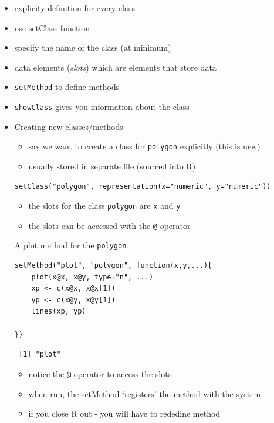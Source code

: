 \documentclass[11pt]{article}
\begin{document}
\begin{itemize}
\item explicity definition for every class
\item use setClass function
\item specify the name of the class (at minimum)
\item data elements (\emph{slots}) which are elements that store data
\item \texttt{setMethod} to define methods
\item \texttt{showClass} gives you information about the class
\end{itemize}
\begin{itemize}

\item Creating new classes/methods
\label{sec-4-3-9-1}%
\begin{itemize}
\item say we want to create a class for \texttt{polygon} explicitly (this is new)
\item usually stored in separate file (sourced into R)
\end{itemize}

\begin{verbatim}
setClass("polygon", representation(x="numeric", y="numeric"))
\end{verbatim}


\begin{itemize}
\item the slots for the class \texttt{polygon} are \texttt{x} and \texttt{y}
\item the slots can be accessed with the \texttt{@} operator
\end{itemize}

A plot method for the \texttt{polygon}


\begin{verbatim}
setMethod("plot", "polygon", function(x,y,...){
    plot(x@x, x@y, type="n", ...)
    xp <- c(x@x, x@x[1])
    yp <- c(x@y, x@y[1])
    lines(xp, yp)

})
\end{verbatim}

\begin{verbatim}
 [1] "plot"
\end{verbatim}

\begin{itemize}
\item notice the \texttt{@} operator to access the slots
\item when run, the setMethod `registers' the method with the system
\item if you close R out - you will have to rededine method
\end{itemize}



\end{itemize}
\end{document}
